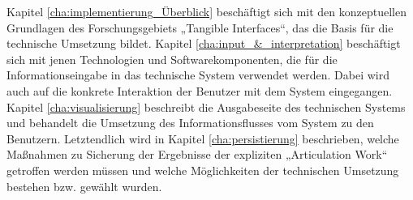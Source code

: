 Kapitel \ref{cha:implementierung_Überblick} beschäftigt sich mit den konzeptuellen Grundlagen des Forschungsgebiets „Tangible Interfaces“, das die Basis für die technische Umsetzung bildet. Kapitel \ref{cha:input_&_interpretation} beschäftigt sich mit jenen Technologien und Softwarekomponenten, die für die Informationseingabe in das technische System verwendet werden. Dabei wird auch auf die konkrete Interaktion der Benutzer mit dem System eingegangen. Kapitel \ref{cha:visualisierung} beschreibt die Ausgabeseite des technischen Systems und behandelt die Umsetzung des Informationsflusses vom System zu den Benutzern. Letztendlich wird in Kapitel \ref{cha:persistierung} beschrieben, welche Maßnahmen zu Sicherung der Ergebnisse der expliziten „Articulation Work“ getroffen werden müssen und welche Möglichkeiten der technischen Umsetzung bestehen bzw. gewählt wurden.












